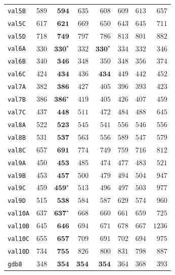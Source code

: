 \begin{table}[htbp]
\begin{tabular}{lrrrrrrr}
\texttt{val5B} & 589 & $\mathbf{594}$ & $635$ & $608$ & $609$ & $613$ & $657$ \\
\texttt{val5C} & 617 & $\mathbf{621}$ & $669$ & $650$ & $643$ & $645$ & $711$ \\
\texttt{val5D} & 718 & $\mathbf{749}$ & $797$ & $786$ & $813$ & $801$ & $882$ \\
\texttt{val6A} & 330 & $\mathbf{330}^{\star}$ & $332$ & $\mathbf{330}^{\star}$ & $334$ & $332$ & $346$ \\
\texttt{val6B} & 340 & $\mathbf{346}$ & $348$ & $350$ & $348$ & $356$ & $374$ \\
\texttt{val6C} & 424 & $\mathbf{434}$ & $436$ & $\mathbf{434}$ & $449$ & $442$ & $452$ \\
\texttt{val7A} & 382 & $\mathbf{386}$ & $427$ & $405$ & $396$ & $393$ & $423$ \\
\texttt{val7B} & 386 & $\mathbf{386}^{\star}$ & $419$ & $405$ & $426$ & $407$ & $459$ \\
\texttt{val7C} & 437 & $\mathbf{448}$ & $511$ & $472$ & $484$ & $488$ & $645$ \\
\texttt{val8A} & 522 & $\mathbf{523}$ & $545$ & $541$ & $556$ & $546$ & $556$ \\
\texttt{val8B} & 531 & $\mathbf{537}$ & $563$ & $556$ & $589$ & $547$ & $579$ \\
\texttt{val8C} & 657 & $\mathbf{691}$ & $774$ & $749$ & $759$ & $716$ & $812$ \\
\texttt{val9A} & 450 & $\mathbf{453}$ & $485$ & $474$ & $477$ & $483$ & $521$ \\
\texttt{val9B} & 453 & $\mathbf{457}$ & $500$ & $479$ & $494$ & $504$ & $947$ \\
\texttt{val9C} & 459 & $\mathbf{459}^{\star}$ & $513$ & $496$ & $497$ & $503$ & $977$ \\
\texttt{val9D} & 515 & $\mathbf{538}$ & $584$ & $587$ & $629$ & $574$ & $960$ \\
\texttt{val10A} & 637 & $\mathbf{637}^{\star}$ & $668$ & $660$ & $661$ & $659$ & $725$ \\
\texttt{val10B} & 645 & $\mathbf{646}$ & $694$ & $671$ & $678$ & $667$ & $1236$ \\
\texttt{val10C} & 655 & $\mathbf{657}$ & $709$ & $691$ & $702$ & $694$ & $975$ \\
\texttt{val10D} & 734 & $\mathbf{755}$ & $826$ & $800$ & $831$ & $798$ & $887$ \\
\texttt{gdb8} & 348 & $\mathbf{354}$ & $\mathbf{354}$ & $\mathbf{354}$ & $364$ & $368$ & $393$ \\

\end{tabular}
\end{table}
